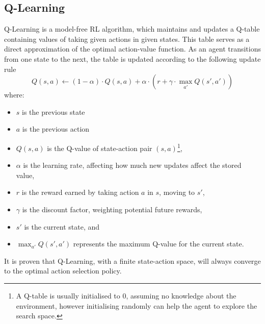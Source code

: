 \subsection{Q-Learning}
Q-Learning \cite{watkins1992q} is a model-free RL algorithm, which maintains and updates a Q-table  containing values of taking given actions in given states. This table serves as a direct approximation of the optimal action-value function. As an agent transitions from one state to the next, the table is updated according to the following update rule
\[
Q(s, a) \leftarrow (1 - \alpha) \cdot Q(s, a) + \alpha \cdot \left( r + \gamma \cdot \max_{a'} Q(s', a') \right)
\]
where:
\begin{itemize}
    \item $s$ is the previous state
    \item $a$ is the previous action
    \item $Q(s, a)$ is the Q-value of state-action pair $(s, a)$\footnote{A Q-table is usually initialised to 0, assuming no knowledge about the environment, however initialising randomly can help the agent to explore the search space.},
    \item $\alpha$ is the learning rate, affecting how much new updates affect the stored value,
    \item $r$ is the reward earned by taking action $a$ in $s$, moving to $s'$,
    \item $\gamma$ is the discount factor, weighting potential future rewards,
    \item $s'$ is the current state, and
    \item $\max_{a'} Q(s', a')$ represents the maximum Q-value for the current state.
\end{itemize}
It is proven that Q-Learning, with a finite state-action space, will always converge to the optimal action selection policy.
